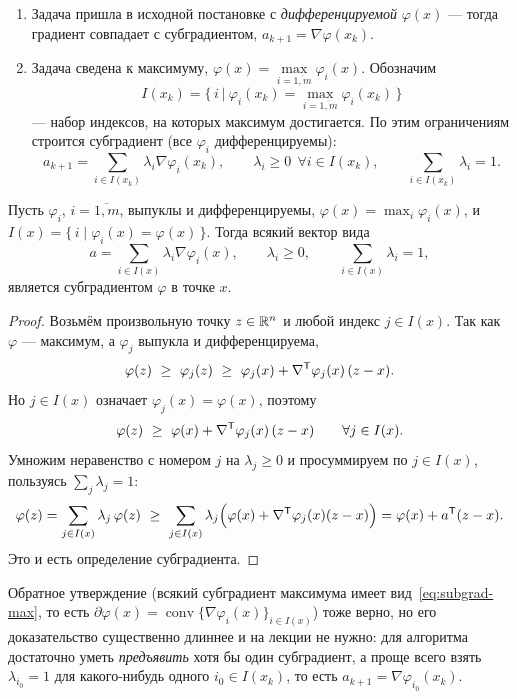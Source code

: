 \begin{enumerate}[label=\arabic*),left=0pt]
  \item Задача пришла в исходной постановке с \emph{дифференцируемой}
        $\varphi(x)$ — тогда градиент совпадает с субградиентом,
        $a_{k+1} = \nabla\varphi(x_k)$.
  \item Задача сведена к максимуму,
        $\varphi(x) = \max\limits_{i=\overline{1,m}} \varphi_i(x)$. Обозначим
        \[
          I(x_k) = \Big\{\, i \ \Big|\ \varphi_i(x_k)
            = \max_{i=\overline{1,m}} \varphi_i(x_k) \,\Big\}
        \]
        — набор индексов, на которых максимум достигается. По этим ограничениям
        строится субградиент (все $\varphi_i$ дифференцируемы):
        \begin{equation}\label{eq:subgrad-max}
          a_{k+1} = \sum_{i \in I(x_k)} \lambda_i \nabla\varphi_i(x_k) ,
          \qquad
          \lambda_i \ge 0 \ \ \forall i \in I(x_k) ,
          \qquad
          \sum_{i \in I(x_k)} \lambda_i = 1 .
        \end{equation}
\end{enumerate}

\begin{lemma}\label{lem:subgrad-max}
Пусть $\varphi_i$, $i = \overline{1,m}$, выпуклы и дифференцируемы,
$\varphi(x) = \max_i \varphi_i(x)$, и
$I(x) = \{\, i \mid \varphi_i(x) = \varphi(x) \,\}$. Тогда всякий вектор вида
\[
  a = \sum_{i \in I(x)} \lambda_i \nabla\varphi_i(x) ,
  \qquad \lambda_i \ge 0 , \qquad \sum_{i \in I(x)} \lambda_i = 1 ,
\]
является субградиентом $\varphi$ в точке $x$.
\end{lemma}

\begin{idea}[title={Доказательство (на лекции не приводилось)}]
\begin{proof}
Возьмём произвольную точку $z \in \mathbb{R}^n$ и любой индекс $j \in I(x)$. Так как
$\varphi$ — максимум, а $\varphi_j$ выпукла и дифференцируема,
\[
  \varphi(z) \ \ge\ \varphi_j(z)
  \ \ge\ \varphi_j(x) + \nabla\T\varphi_j(x)\,(z - x) .
\]
Но $j \in I(x)$ означает $\varphi_j(x) = \varphi(x)$, поэтому
\[
  \varphi(z) \ \ge\ \varphi(x) + \nabla^{\mathsf{T}}\varphi_j(x)\,(z - x)
  \qquad \forall j \in I(x) .
\]
Умножим неравенство с номером $j$ на $\lambda_j \ge 0$ и просуммируем по
$j \in I(x)$, пользуясь $\sum_j \lambda_j = 1$:
\[
  \varphi(z) = \sum_{j \in I(x)} \lambda_j\, \varphi(z)
  \ \ge\ \sum_{j \in I(x)} \lambda_j
         \Big( \varphi(x) + \nabla^{\mathsf{T}}\varphi_j(x)(z-x) \Big)
  = \varphi(x) + a^{\mathsf{T}} (z - x) .
\]
Это и есть определение субградиента. \qedhere
\end{proof}

\medskip
Обратное утверждение (всякий субградиент максимума имеет вид~\eqref{eq:subgrad-max},
то есть $\partial\varphi(x) = \operatorname{conv}\{\nabla\varphi_i(x)\}_{i \in I(x)}$)
тоже верно, но его доказательство существенно длиннее и на лекции не нужно: для
алгоритма достаточно уметь \emph{предъявить} хотя бы один субградиент, а проще
всего взять $\lambda_{i_0} = 1$ для какого-нибудь одного $i_0 \in I(x_k)$, то
есть $a_{k+1} = \nabla\varphi_{i_0}(x_k)$.
\end{idea}

